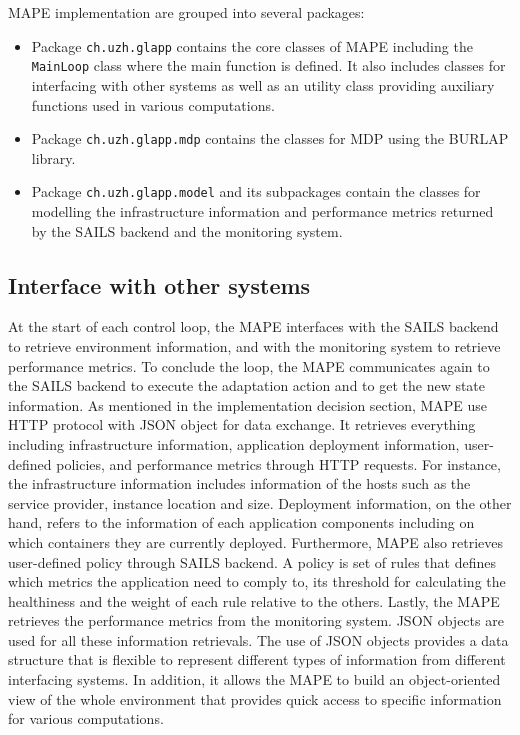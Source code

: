 \documentclass{seal_thesis}
\begin{document}
MAPE implementation are grouped into several packages:
\begin{itemize}
\item Package \texttt{ch.uzh.glapp} contains the core classes of MAPE including the \texttt{MainLoop} class where the main function is defined.
It also includes classes for interfacing with other systems as well as an utility class providing auxiliary functions used in various computations. 
\item Package \texttt{ch.uzh.glapp.mdp} contains the classes for MDP using the BURLAP library.
\item Package \texttt{ch.uzh.glapp.model} and its subpackages contain the classes for modelling the infrastructure information and performance metrics returned by the SAILS backend and the monitoring system.
\end{itemize}

\subsection{Interface with other systems}
At the start of each control loop, the MAPE interfaces with the SAILS backend to retrieve environment information, and with the monitoring system to retrieve performance metrics. To conclude the loop, the MAPE communicates again to the SAILS backend to execute the adaptation action and to get the new state information.
As mentioned in the implementation decision section, MAPE use HTTP protocol with JSON object for data exchange.
It retrieves everything including infrastructure information, application deployment information, user-defined policies, and performance metrics through HTTP requests.
For instance, the infrastructure information includes information of the hosts such as the service provider, instance location and size. Deployment information, on the other hand, refers to the information of each application components including on which containers they are currently deployed.
Furthermore, MAPE also retrieves user-defined policy through SAILS backend.
A policy is set of rules that defines which metrics the application need to comply to, its threshold for calculating the healthiness and the weight of each rule relative to the others.
Lastly, the MAPE retrieves the performance metrics from the monitoring system.
JSON objects are used for all these information retrievals.
The use of JSON objects provides a data structure that is flexible to represent different types of information from different interfacing systems.
In addition, it allows the MAPE to build an object-oriented view of the whole environment that provides quick access to specific information for various computations.
\end{document}
